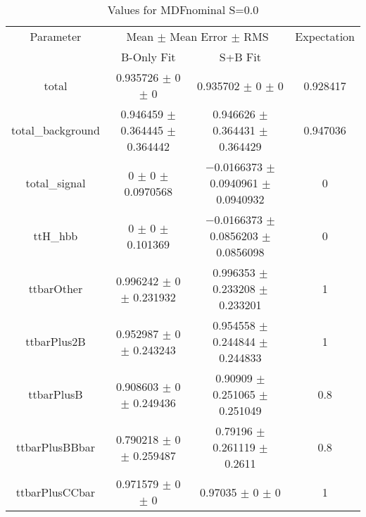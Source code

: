 \begin{table}
\centering
\caption{Values for MDFnominal S=0.0}
\begin{tabular}{cccc}
\toprule
Parameter & \multicolumn{2}{c}{Mean $\pm$ Mean Error $\pm$ RMS} & Expectation\\
 & B-Only Fit & S+B Fit & \\
\midrule
total & \num{0.935726} $\pm$ \num{0} $\pm$ \num{0} & \num{0.935702} $\pm$ \num{0} $\pm$ \num{0} & \num{0.928417}\\
total\_background & \num{0.946459} $\pm$ \num{0.364445} $\pm$ \num{0.364442} & \num{0.946626} $\pm$ \num{0.364431} $\pm$ \num{0.364429} & \num{0.947036}\\
total\_signal & \num{0} $\pm$ \num{0} $\pm$ \num{0.0970568} & \num{-0.0166373} $\pm$ \num{0.0940961} $\pm$ \num{0.0940932} & \num{0}\\
ttH\_hbb & \num{0} $\pm$ \num{0} $\pm$ \num{0.101369} & \num{-0.0166373} $\pm$ \num{0.0856203} $\pm$ \num{0.0856098} & \num{0}\\
ttbarOther & \num{0.996242} $\pm$ \num{0} $\pm$ \num{0.231932} & \num{0.996353} $\pm$ \num{0.233208} $\pm$ \num{0.233201} & \num{1}\\
ttbarPlus2B & \num{0.952987} $\pm$ \num{0} $\pm$ \num{0.243243} & \num{0.954558} $\pm$ \num{0.244844} $\pm$ \num{0.244833} & \num{1}\\
ttbarPlusB & \num{0.908603} $\pm$ \num{0} $\pm$ \num{0.249436} & \num{0.90909} $\pm$ \num{0.251065} $\pm$ \num{0.251049} & \num{0.8}\\
ttbarPlusBBbar & \num{0.790218} $\pm$ \num{0} $\pm$ \num{0.259487} & \num{0.79196} $\pm$ \num{0.261119} $\pm$ \num{0.2611} & \num{0.8}\\
ttbarPlusCCbar & \num{0.971579} $\pm$ \num{0} $\pm$ \num{0} & \num{0.97035} $\pm$ \num{0} $\pm$ \num{0} & \num{1}\\
\bottomrule
\end{tabular}
\end{table}